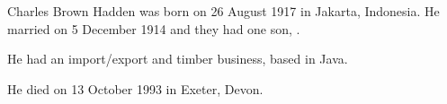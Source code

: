 
Charles Brown Hadden was born on 26 August 1917 in Jakarta, Indonesia.  He married  on 5 December 1914\cite{JHMbible,FlickrJohnHillTree} and they had one son, .

He had an import/export and timber business, based in Java.

He died on 13 October 1993 in Exeter, Devon.\cite{CharlesBrownHaddenDeath}
